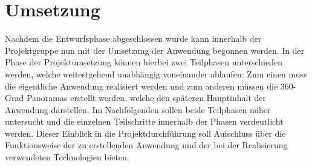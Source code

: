 \section{Umsetzung}
\label{sec:Umsetzung}

Nachdem die Entwurfsphase abgeschlossen wurde kann innerhalb der Projektgruppe
nun mit der Umsetzung der Anwendung begonnen werden. In der Phase der
Projektumsetzung können hierbei zwei Teilphasen unterschieden werden, welche
weitestgehend unabhängig voneinander ablaufen: Zum einen muss die eigentliche
Anwendung realisiert werden und zum anderen müssen die 360-Grad Panoramas
erstellt werden, welche den späteren Hauptinhalt der Anwendung darstellen.
Im Nachfolgenden sollen beide Teilphasen näher untersucht und die einzelnen
Teilschritte innerhalb der Phasen verdeutlicht werden. Dieser Einblick in die
Projektdurchführung soll Aufschluss über die Funktionsweise der zu erstellenden
Anwendung und der bei der Realisierung verwendeten Technologien bieten.


